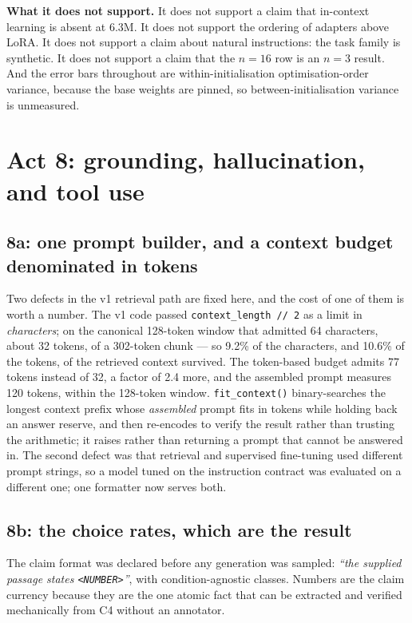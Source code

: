 \documentclass[11pt,a4paper]{article}
\begin{document}
\textbf{What it does not support.} It does not support a claim that in-context
learning is absent at 6.3M. It does not support the ordering of adapters above
LoRA. It does not support a claim about natural instructions: the task family
is synthetic. It does not support a claim that the $n = 16$ row is an
$n = 3$ result. And the error bars throughout are within-initialisation
optimisation-order variance, because the base weights are pinned, so
between-initialisation variance is unmeasured.

\section{Act 8: grounding, hallucination, and tool use}
\label{sec:act8}

\subsection{8a: one prompt builder, and a context budget denominated in tokens}
\label{sec:act8a}

Two defects in the v1 retrieval path are fixed here, and the cost of one of
them is worth a number. The v1 code passed \texttt{context\_length // 2} as a
limit in \emph{characters}; on the canonical 128-token window that admitted 64
characters, about 32 tokens, of a 302-token chunk --- so 9.2\% of the
characters, and 10.6\% of the tokens, of the retrieved context survived. The
token-based budget admits 77 tokens instead of 32, a factor of 2.4 more, and
the assembled prompt measures 120 tokens, within the 128-token window.
\texttt{fit\_context()} binary-searches the longest context prefix whose
\emph{assembled} prompt fits in tokens while holding back an answer reserve,
and then re-encodes to verify the result rather than trusting the arithmetic;
it raises rather than returning a prompt that cannot be answered in. %
 The second
defect was that retrieval and supervised fine-tuning used different prompt
strings, so a model tuned on the instruction contract was evaluated on a
different one; one formatter now serves both. %


\subsection{8b: the choice rates, which are the result}
\label{sec:act8b}

The claim format was declared before any generation was sampled: \emph{``the
supplied passage states \texttt{<NUMBER>}''}, with condition-agnostic classes.
Numbers are the claim currency because they are the one atomic fact that can
be extracted and verified mechanically from C4 without an annotator.
\end{document}
